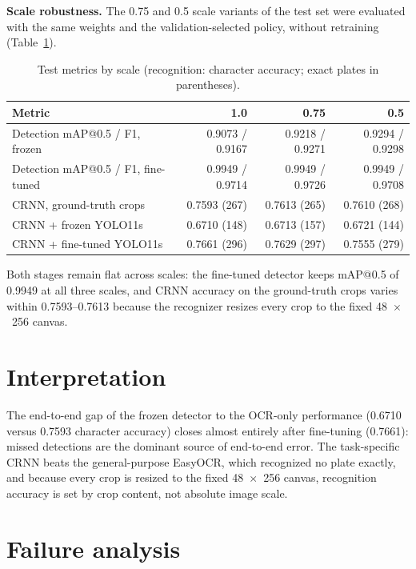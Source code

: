 \documentclass[10pt]{article}
\begin{document}
\textbf{Scale robustness.} The 0.75 and 0.5 scale variants of the test
set were evaluated with the same weights and the validation-selected
policy, without retraining (Table~\ref{tab:scale}).

\begin{table}[H]
\centering
\small
\setlength{\tabcolsep}{6pt}
\begin{tabular}{@{}lrrr@{}}
\toprule
Metric & 1.0 & 0.75 & 0.5 \\
\midrule
Detection mAP@0.5 / F1, frozen & 0.9073 / 0.9167 & 0.9218 / 0.9271 & 0.9294 / 0.9298 \\
Detection mAP@0.5 / F1, fine-tuned & 0.9949 / 0.9714 & 0.9949 / 0.9726 & 0.9949 / 0.9708 \\
\midrule
CRNN, ground-truth crops & 0.7593 (267) & 0.7613 (265) & 0.7610 (268) \\
CRNN + frozen YOLO11s & 0.6710 (148) & 0.6713 (157) & 0.6721 (144) \\
CRNN + fine-tuned YOLO11s & 0.7661 (296) & 0.7629 (297) & 0.7555 (279) \\
\bottomrule
\end{tabular}
\caption{Test metrics by scale (recognition: character accuracy; exact
plates in parentheses).}
\label{tab:scale}
\end{table}

Both stages remain flat across scales: the fine-tuned detector keeps
mAP@0.5 of 0.9949 at all three scales, and CRNN accuracy on the
ground-truth crops varies within 0.7593--0.7613 because the recognizer
resizes every crop to the fixed 48~$\times$~256 canvas.

\section{Interpretation}

The end-to-end gap of the frozen detector to the OCR-only performance
(0.6710 versus 0.7593 character accuracy) closes almost entirely after
fine-tuning (0.7661): missed detections are the dominant source of
end-to-end error. The task-specific CRNN beats the general-purpose
EasyOCR, which recognized no plate exactly, and because every crop is
resized to the fixed 48~$\times$~256 canvas, recognition accuracy is set
by crop content, not absolute image scale.

\section{Failure analysis}
\end{document}
